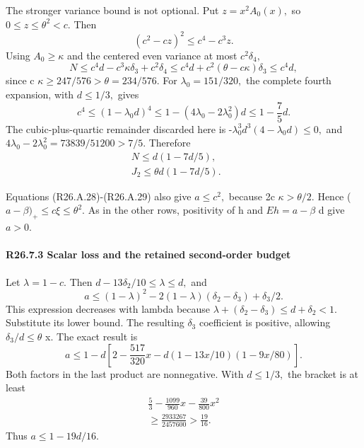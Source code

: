 The stronger variance bound is not optional. Put \(z=x^2A_0(x),\allowbreak \) so
\(0\le z\le \theta^2<c.\) Then
\[
(c^2-cz)^2\le c^4-c^3z.
\]
Using \(A_0\ge \kappa\) and the centered even variance at most \(c^2\delta_4,\allowbreak \)
\[
N\le c^4d-c^3\kappa \delta_3+c^2\delta_4
\le c^4d+c^2(\theta-c\kappa)\delta_3\le c^4d,
\]
since c \(\kappa\ge 247/576>\theta=234/576.\)
For \(\lambda_0=151/320,\allowbreak \) the complete fourth expansion, with \(d\le 1/3,\allowbreak \) gives
\[
c^4\le(1-\lambda_0d)^4
\le1-(4\lambda_0-2\lambda_0^2)d
\le1-\frac75d.
\]
The cubic-plus-quartic remainder discarded here is
-\(\lambda_0^3d^3(4-\lambda_0d)\le 0,\allowbreak \) and
\(4\lambda_0-2\lambda_0^2=73839/51200>7/5.\) Therefore
\[
\begin{gathered}
N\le d(1-7d/5),\qquad\\
J_2\le\theta d(1-7d/5).
\end{gathered}\tag{R26.A.31}
\]

Equations (R26.A.28)-(R26.A.29) also give \(a\le c^2,\allowbreak \) because
2c \(\kappa>\theta/2.\) Hence (\(a-\beta)_+\le c \xi\le \theta^2.\)
As in the other rows, positivity of h and \(Eh=a-\beta\) d give \(a>0.\)

\paragraph{R26.7.3 Scalar loss and the retained second-order budget}

Let \(\lambda=1-c.\) Then \(d-13\delta_2/10\le \lambda\le d,\allowbreak \) and
\[
a\le(1-\lambda)^2-2(1-\lambda)(\delta_2-\delta_3)+\delta_3/2.
\]
This expression decreases with lambda because
\(\lambda+(\delta_2-\delta_3)\le d+\delta_2<1.\) Substitute its lower bound.
The resulting \(\delta_3\) coefficient is positive, allowing \(\delta_3/d\le \theta\) x.
The exact result is
\[
a\le1-d\left[
2-\frac{517}{320}x
-d(1-13x/10)(1-9x/80)
\right].
\]
Both factors in the last product are nonnegative. With \(d\le 1/3,\allowbreak \) the
bracket is at least
\[
\begin{gathered}
\frac53-\frac{1099}{960}x-\frac{39}{800}x^2\\
\ge\frac{2933267}{2457600}>\frac{19}{16}.
\end{gathered}
\]
Thus \(a\le 1-19d/16.\)

